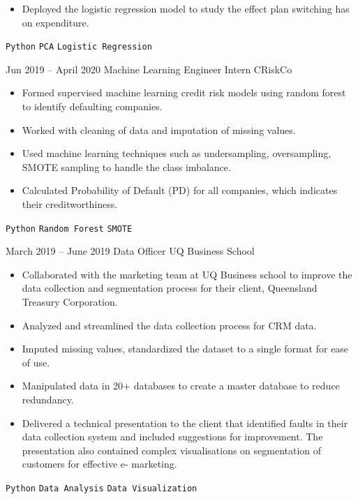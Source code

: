 \documentclass[9pt]{developercv} %
\begin{document}
\begin{entrylist}
{\begin{itemize}[noitemsep,topsep=0pt,parsep=0pt,partopsep=0pt, leftmargin=-1pt]
            \item Deployed the logistic regression model to study the effect plan switching has on expenditure.
        \end{itemize} 
        \texttt{Python} \slashsep \texttt{PCA} \slashsep \texttt{Logistic Regression}}
	\entry
		{Jun 2019 -- April 2020}
		{Machine Learning Engineer Intern}
		{CRiskCo}
		{\vspace{-10pt}
        \begin{itemize}[noitemsep,topsep=0pt,parsep=0pt,partopsep=0pt, leftmargin=-1pt]
            \item Formed supervised machine learning credit risk models using random forest to identify defaulting companies.
            \item Worked with cleaning of data and imputation of missing values.
            \item Used machine learning techniques such as undersampling, oversampling, SMOTE sampling to handle the class imbalance.
            \item Calculated Probability of Default (PD) for all companies, which indicates their creditworthiness.
        \end{itemize} 
        \texttt{Python} \slashsep \texttt{Random Forest} \slashsep \texttt{SMOTE}}
    \entry
		{March 2019 -- June 2019}
		{Data Officer}
		{UQ Business School}
		{\vspace{-10pt}
        \begin{itemize}[noitemsep,topsep=0pt,parsep=0pt,partopsep=0pt, leftmargin=-1pt]
            \item Collaborated with the marketing team at UQ Business school to improve the data collection and segmentation process for their client, Queensland Treasury Corporation.
            \item Analyzed and streamlined the data collection process for CRM data.
            \item Imputed missing values, standardized the dataset to a single format for ease of use.
            \item Manipulated data in 20+ databases to create a master database to reduce redundancy.
            \item Delivered a technical presentation to the client that identified faults in their data collection system and included suggestions for improvement. The presentation also contained complex visualisations on segmentation of customers for effective e- marketing.
        \end{itemize} 
        \texttt{Python} \slashsep \texttt{Data Analysis} \slashsep \texttt{Data Visualization}}
\end{entrylist}
\end{document}
